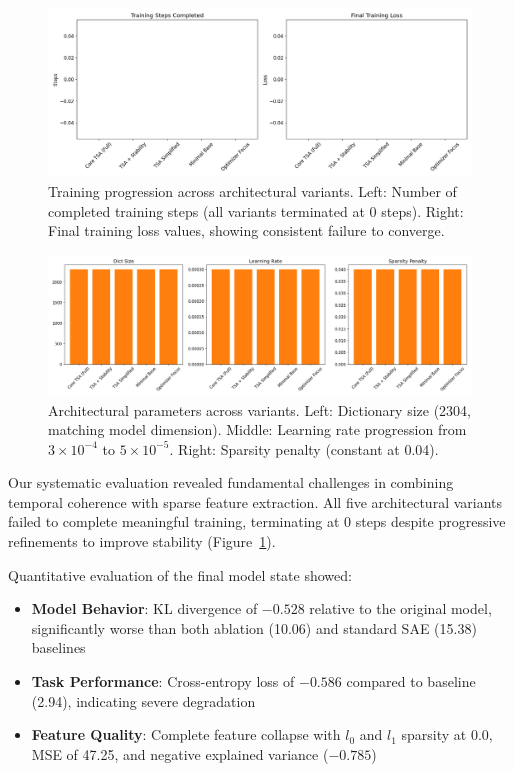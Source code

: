 \begin{figure}[t]
\centering
\includegraphics[width=\linewidth]{training_metrics.png}
\caption{Training progression across architectural variants. Left: Number of completed training steps (all variants terminated at 0 steps). Right: Final training loss values, showing consistent failure to converge.}
\label{fig:training_metrics}
\end{figure}

\begin{figure}[t]
\centering
\includegraphics[width=\linewidth]{architecture_comparison.png}
\caption{Architectural parameters across variants. Left: Dictionary size (2304, matching model dimension). Middle: Learning rate progression from $3\times10^{-4}$ to $5\times10^{-5}$. Right: Sparsity penalty (constant at 0.04).}
\label{fig:architecture_comparison}
\end{figure}

Our systematic evaluation revealed fundamental challenges in combining temporal coherence with sparse feature extraction. All five architectural variants failed to complete meaningful training, terminating at 0 steps despite progressive refinements to improve stability (Figure~\ref{fig:training_metrics}).

Quantitative evaluation of the final model state showed:

\begin{itemize}
\item \textbf{Model Behavior}: KL divergence of $-0.528$ relative to the original model, significantly worse than both ablation (10.06) and standard SAE (15.38) baselines \cite{anthropic2022decomposition}
\item \textbf{Task Performance}: Cross-entropy loss of $-0.586$ compared to baseline (2.94), indicating severe degradation
\item \textbf{Feature Quality}: Complete feature collapse with $l_0$ and $l_1$ sparsity at 0.0, MSE of 47.25, and negative explained variance ($-0.785$)
\end{itemize}

